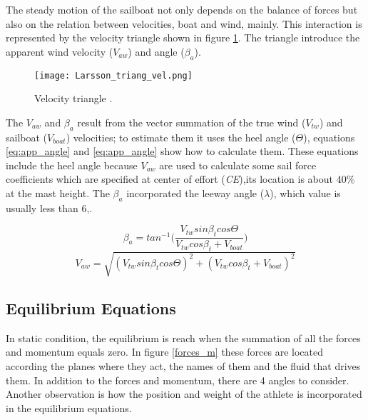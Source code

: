 The steady motion of the sailboat not only depends on the balance of forces but also on the relation between velocities, boat and wind, mainly. This interaction is represented by the velocity triangle shown in figure \ref{vel_triangle}. The triangle introduce the apparent wind velocity ($V_{aw}$) and angle ($\beta_{a}$).\par 
\begin{figure}[ht]
\centering
  \texttt{[image: Larsson\_triang\_vel.png]}
 \caption{Velocity triangle  \cite{larsonprinciples}. }
\label{vel_triangle}
\end{figure}
The $V_{aw}$ and $\beta_{a}$ result from the vector summation of the true wind ($V_{tw}$) and sailboat ($V_{boat}$) velocities; to estimate them it uses the heel angle ($\Theta$), equations \ref{eq:app_angle} and \ref{eq:app_angle} show how to calculate them. These equations include the heel angle because $V_{aw}$ are used to calculate some sail force coefficients which are specified at center of effort (\textit{CE}),its location is about 40\% at the mast height. The $\beta_{a}$ incorporated the leeway angle ($\lambda$), which value is usually less than 6\degree \cite{philpott1993yacht},\cite{claughton1998sailing}. \par
\begin{equation} \label{eq:app_angle}
    \beta_{a}=tan^{-1} \bigg( \frac{ V_{tw} sin \beta_{t} cos \Theta }{ V_{tw} cos \beta_{t} + V_{boat}} \bigg)
\end{equation}
\newline
\begin{equation} \label{eq:ap_vel}
    V_{aw}=  \sqrt{ (V_{tw} sin \beta_{t} cos \Theta)^2 + (V_{tw} cos \beta_{t} + V_{boat})^2}
\end{equation}
\subsection {Equilibrium Equations} \label{section_equil_equat}
In static condition, the equilibrium is reach when the summation of all the forces and momentum equals zero. In figure \ref{forces_m} these forces are located according the planes where they act, the names of them and the fluid that drives them. In addition to the forces and momentum, there are 4 angles to consider. Another observation is how the position and weight of the athlete is incorporated in the equilibrium equations. \par 

